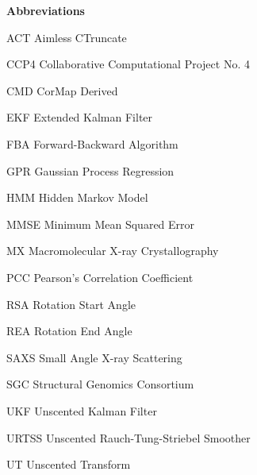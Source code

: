 {\thispagestyle{empty} \center \bfseries Abbreviations \\[0.4cm]}
\newenvironment{abbreviations}%
{\begin{list}{}{\renewcommand{\makelabel}{\abbrlabel}}}{\end{list}}
\begin{abbreviations}
\item[ACT] Aimless CTruncate
\item[CCP4] Collaborative Computational Project No. 4
\item[CMD] CorMap Derived
\item[EKF] Extended Kalman Filter
\item[FBA] Forward-Backward Algorithm
\item[GPR] Gaussian Process Regression
\item[HMM] Hidden Markov Model
\item[MMSE] Minimum Mean Squared Error
\item[MX] Macromolecular X-ray Crystallography
\item[PCC] Pearson's Correlation Coefficient
\item[RSA] Rotation Start Angle
\item[REA] Rotation End Angle
\item[SAXS] Small Angle X-ray Scattering
\item[SGC] Structural Genomics Consortium
\item[UKF] Unscented Kalman Filter
\item[URTSS] Unscented Rauch-Tung-Striebel Smoother
\item[UT] Unscented Transform
\end{abbreviations}
